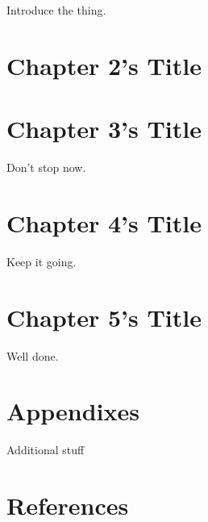 \documentclass[]{dissertateCICESE}
\begin{document}
Introduce the thing.

\FloatBarrier

\newpage
{}
\fancyhead[R]{\thepage}
\fancyfoot[C]{}

\chapter{Chapter 2's Title}

\FloatBarrier

\newpage
{}
\fancyhead[R]{\thepage}
\fancyfoot[C]{}

\chapter{Chapter 3's Title}

Don't stop now.

\FloatBarrier
\newpage
{}
\fancyhead[R]{\thepage}
\fancyfoot[C]{}

\chapter{Chapter 4's Title}

Keep it going.

\FloatBarrier
\newpage
{}
\fancyhead[R]{\thepage}
\fancyfoot[C]{}

\chapter{Chapter 5's Title}

Well done.

\FloatBarrier

\newpage
{}
\fancyhead[R]{\thepage}
\fancyfoot[C]{}

\chapter*{\fontsize{16pt}{18}\textbf{Appendixes}}

Additional stuff

\FloatBarrier

\newpage
{}
\fancyhead[R]{\thepage}
\fancyfoot[C]{}

\chapter*{\fontsize{16pt}{18}\textbf{References}}

\setlength{\parindent}{-0.5in}
\setlength{\leftskip}{0.4in}
\setlength{\parskip}{6pt}

\noindent
\end{document}
